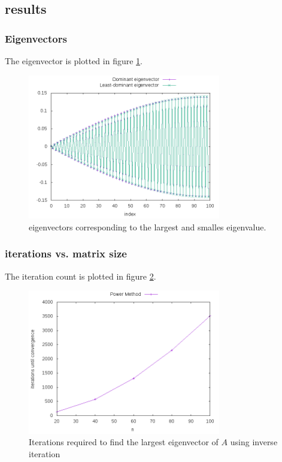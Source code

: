\subsection{results}
\subsubsection{Eigenvectors}
The eigenvector is plotted in figure \ref{fig:eigenvectors}.
\begin{figure}[h!]
  \centering \includegraphics[width=0.75\textwidth]{plots/eigenvectors.png}
  \caption{eigenvectors corresponding to the largest and smalles eigenvalue.}
  \label{fig:eigenvectors}
\end{figure}

\subsubsection{iterations vs. matrix size}
The iteration count is plotted in figure \ref{fig:iterations_inverse}.
\begin{figure}[h!]
  \centering \includegraphics[width=0.75\textwidth]{plots/iterations_vs_n.png}
  \caption{Iterations required to find the largest eigenvector of $A$ using inverse iteration}
  \label{fig:iterations_inverse}
\end{figure}

